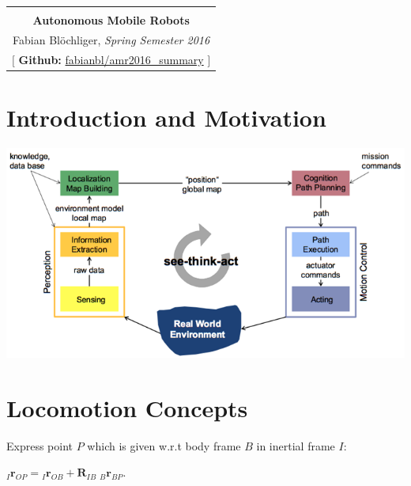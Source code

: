 \documentclass[landscape]{article}
\newcommand{\vmspace}{\vspace{-7pt}}
\newcommand{\vtspace}{\vspace{-10pt}}
\begin{document}
\pagestyle{empty}
\raggedright
\setlength{\columnsep}{2mm}
\setlength{\columnseprule}{0.1mm}
\renewcommand{\labelitemi}{--}

\begin{multicols}{3}

\begin{tabular}{|c|}\hline
  \\[-8pt]
  \LARGE \textbf{Autonomous Mobile Robots}\\[6pt]
  \large Fabian Bl\"ochliger, \textit{Spring Semester 2016}\\[6pt]
  \normalsize $[$ \textbf{Github:} \href{https://github.com/fabianbl/amr2016_summary}{fabianbl/amr2016\_summary} $]$ \\\hline
\end{tabular}

\vtspace

\section{Introduction and Motivation}

\vmspace

\includegraphics[width=\columnwidth]{img/1_SeeThinkAct.png}

\vspace{-12pt}

\section{Locomotion Concepts}

\vmspace

\begin{minipage}{\columnwidth}
  Express point $P$ which is given w.r.t body frame $B$ in inertial frame $I$:
  \vmspace
  \vmspace
  \begin{center}
  ${}_I\mathbf{r}_{OP} = {}_I\mathbf{r}_{OB} +
  \mathbf{R}_{IB}\;{}_B\mathbf{r}_{BP}$.
  \end{center}
\end{minipage}


\end{multicols}
\end{document}
